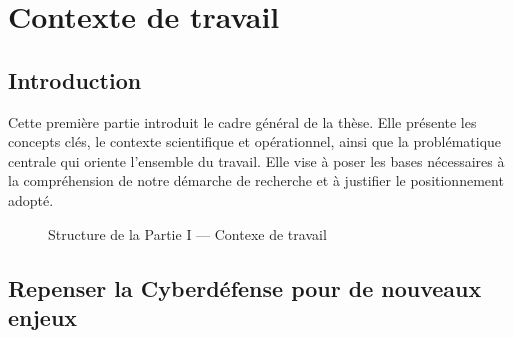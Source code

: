\documentclass[ twoside,openright,titlepage,numbers=noenddot,headinclude,%
                footinclude=true,cleardoublepage=empty,abstractoff, %
                BCOR=5mm,paper=a4,fontsize=11pt,%
                french,american,%
                ]{scrreprt}
\begin{document}


\cleardoublepage
{}
{}
\part{Contexte de travail}

\chapter*{Introduction}

Cette première partie introduit le cadre général de la thèse. Elle présente les concepts clés, le contexte scientifique et opérationnel, ainsi que la problématique centrale qui oriente l'ensemble du travail. Elle vise à poser les bases nécessaires à la compréhension de notre démarche de recherche et à justifier le positionnement adopté.

\begin{figure}[h!]
    \centering
    \resizebox{\textwidth}{!}{%
        
    }
    \caption{Structure de la Partie I — Contexe de travail}
\end{figure}


\chapter{Repenser la Cyberdéfense pour de nouveaux enjeux}
\end{document}
